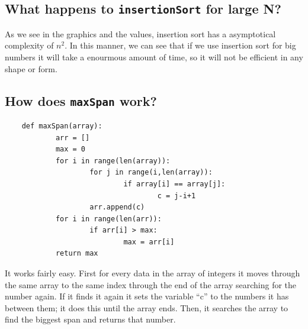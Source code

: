 \documentclass[a4paper,12pt]{article}
\begin{document}
    \subsection{What happens to \texttt{insertionSort} for large N?}
    As we see in the graphics and the values, insertion sort has a asymptotical
complexity of $n^2$. In this manner, we can see that if we use insertion sort for
big numbers it will take a enourmous amount of time, so it will not be
efficient in any shape or form.

  \subsection{How does \texttt{maxSpan} work?}
  \begin{Verbatim}
    def maxSpan(array):
            arr = []
            max = 0
            for i in range(len(array)):
                    for j in range(i,len(array)):
                            if array[i] == array[j]:
                                    c = j-i+1
                    arr.append(c)
            for i in range(len(arr)):
                    if arr[i] > max:
                            max = arr[i]
            return max
  \end{Verbatim}
It works fairly easy. First for every data in the array of integers it moves
through the same array to the same index through the end of the array
searching for the number again. If it finds it again it sets the variable ``c''
to the numbers it has between them; it does this until the array ends. Then,
it searches the array to find the biggest span and returns that number.
\end{document}
